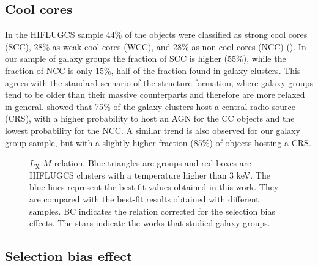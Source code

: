 \documentclass{aa} %
\begin{document}
\subsection{Cool cores}
In the HIFLUGCS sample 44$\%$ of the objects were classified as strong
cool cores (SCC), 28$\%$ as weak cool cores (WCC), and 28$\%$ as non-cool cores (NCC) (\citealt{2010A&A...513A..37H}). In
our sample of galaxy groups the fraction of SCC is
higher (55$\%$), while the fraction of NCC is only
$15\%$, half of the fraction found in galaxy clusters. This agrees with the standard
scenario of the structure formation, where galaxy groups tend to be older
than their massive counterparts and therefore are more
relaxed in general. \citet{2009A&A...501..835M} showed that 75$\%$ of the galaxy
clusters host a central radio source (CRS), with a higher probability
to host an AGN for the CC objects and the lowest probability for the NCC. A
similar trend is also observed for our galaxy group sample, but
with a slightly higher fraction (85$\%$) of objects hosting a CRS.



\begin{figure*}[!ht]
\begin{center}
\end{center}
\caption{
$L_{\text{X}}$-$M$ relation. Blue triangles are groups and red boxes are HIFLUGCS clusters with a temperature higher than 3 keV. The blue lines represent the best-fit values obtained in this work. They are compared with the best-fit results obtained with different samples. BC indicates the relation corrected for the selection bias effects.  The stars indicate the works that studied galaxy groups.
}
\label{fig:LM}
\end{figure*}


\subsection{Selection bias effect}\label{malmsubsect}
\end{document}
